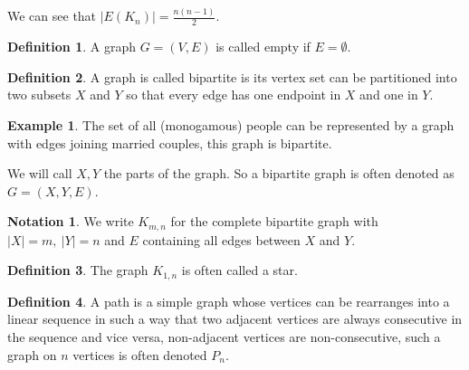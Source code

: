 \documentclass{article}
\theoremstyle{definition}
\newtheorem*{defn}{Definition}
\newtheorem*{ex}{Example}
\newtheorem*{nota}{Notation}
\begin{document}
We can see that $|E(K_n)| = \frac{n(n-1)}{2}$.
\begin{defn}
A graph $G=(V,E)$ is called empty if $E=\emptyset$.
\end{defn}

\begin{defn}
A graph is called bipartite is its vertex set can be partitioned into two subsets $X$ and $Y$ so that every edge has one endpoint in $X$ and one in $Y$.
\end{defn}

\begin{ex}
The set of all (monogamous) people can be represented by a graph with edges joining married couples, this graph is bipartite.
\end{ex}

We will call $X,Y$ the parts of the graph. So a bipartite graph is often denoted as $G = (X,Y,E)$.
\begin{nota}
We write $K_{m,n}$ for the complete bipartite graph with $|X| = m,\ |Y| = n$ and $E$ containing all edges between $X$ and $Y$.
\end{nota}

\begin{defn}
The graph $K_{1,n}$ is often called a star.
\end{defn}
\begin{center}
\end{center}

\begin{defn}
A path is a simple graph whose vertices can be rearranges into a linear sequence in such a way that two adjacent vertices are always consecutive in the sequence and vice versa, non-adjacent vertices are non-consecutive, such a graph on $n$ vertices is often denoted $P_n$.
\end{defn}
\begin{center}
\end{center}
\end{document}
